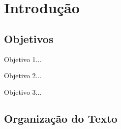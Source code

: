 \chapter{Introdução}

\lipsum[1-2]

\section{Objetivos}

\lipsum[3-4]

\begin{alineas}
\item Objetivo 1...
\item Objetivo 2...
\item Objetivo 3...
\end{alineas} 

\section{Organização do Texto}

\lipsum[5-6]
